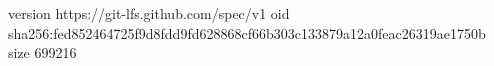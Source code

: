 version https://git-lfs.github.com/spec/v1
oid sha256:fed852464725f9d8fdd9fd628868cf66b303c133879a12a0feac26319ae1750b
size 699216
